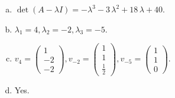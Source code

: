 \begin{questions}
\begin{solution}
\begin{enumerate}[(a)]
\item $\det(A-\lambda I)=-{\lambda}^{3} - 3 \, {\lambda}^{2} + 18 \, {\lambda} + 40$.
\item ${\lambda}_1=4, {\lambda}_2=-2, {\lambda}_3=-5$.
\item $v_{4}=\left(\begin{array}{r}
1 \\
-2 \\
-2
\end{array}\right), v_{-2}=\left(\begin{array}{r}
1 \\
1 \\
\frac{1}{2}
\end{array}\right), v_{-5}=\left(\begin{array}{r}
1 \\
1 \\
0
\end{array}\right)$.
\item Yes.
\end{enumerate}
\end{solution}

\end{questions}

\newpage


\begin{center}
\end{center}

